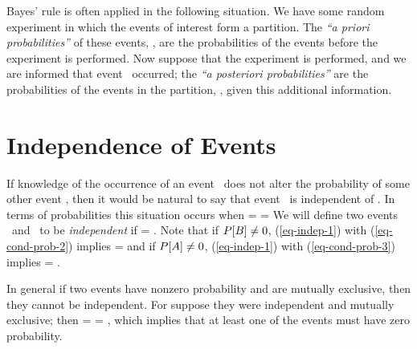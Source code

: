 	\item
	Bayes' rule is often applied in the following situation.
	We have some random experiment in which the events of interest
	form a partition.
	The \emph{``a priori probabilities''} of these events,
	, are the probabilities of the events
	before the experiment is performed.
	Now suppose that the experiment is performed,
	and we are informed that event \sA\ occurred;
	the \emph{``a posteriori probabilities''}
	are the probabilities of the events in the partition,
	, given this additional information.


	\item {}

\eit

\section{Independence of Events}

\bit
	\item If knowledge of the occurrence of an event \sB\
	does not alter the probability of some other event \sA,
	then it would be natural to say that event \sA\ is independent of \sB.
	In terms of probabilities this situation occurs when
	\beq
		 =  = 
	\eeq
	We will define two events \sA\ and \sB\ to be \emph{independent}
	if
		 =  .
	\eeql
	Note that if $P[B]\neq 0$, (\ref{eq-indep-1}) with (\ref{eq-cond-prob-2}) implies
	\beql{eq-indep-2}
		 = 
	\eeql
	and if $P[A]\neq 0$, (\ref{eq-indep-1}) with (\ref{eq-cond-prob-3}) implies
	\beql{eq-indep-3}
		 = .
	\eeql

	\item In general
	if two events have nonzero probability and are mutually exclusive,
	then they cannot be independent.
	For suppose they were independent and mutually exclusive;
	then
	 =  =  ,
	\eeq
	which implies that at least one of the events must have zero probability.

	\item {}



